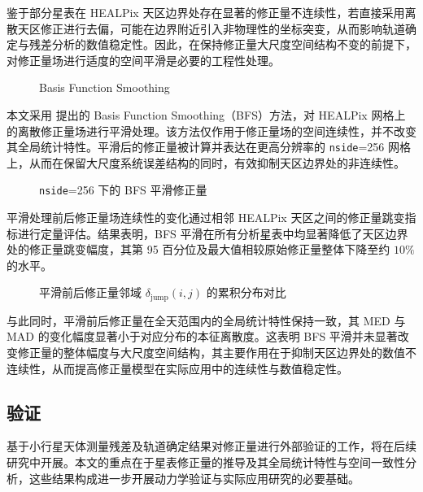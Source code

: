 \documentclass{aastex701}
\begin{document}
鉴于部分星表在 HEALPix 天区边界处存在显著的修正量不连续性，若直接采用离散天区修正进行去偏，可能在边界附近引入非物理性的坐标突变，从而影响轨道确定与残差分析的数值稳定性。因此，在保持修正量大尺度空间结构不变的前提下，对修正量场进行适度的空间平滑是必要的工程性处理。

\begin{figure}[ht!]
\caption{Basis Function Smoothing}
\label{fig:bias_ucac4_zoom_compare_n256}
\end{figure}

本文采用 \citet{Eggl2020Icarus} 提出的 Basis Function Smoothing（BFS）方法，对 HEALPix 网格上的离散修正量场进行平滑处理。该方法仅作用于修正量场的空间连续性，并不改变其全局统计特性。平滑后的修正量被计算并表达在更高分辨率的 \texttt{nside}=256 网格上，从而在保留大尺度系统误差结构的同时，有效抑制天区边界处的非连续性。

\begin{figure}[ht!]
\caption{\texttt{nside}=256 下的 BFS 平滑修正量}
\label{fig:bias_smooth}
\end{figure}

平滑处理前后修正量场连续性的变化通过相邻 HEALPix 天区之间的修正量跳变指标进行定量评估。结果表明，BFS 平滑在所有分析星表中均显著降低了天区边界处的修正量跳变幅度，其第 95 百分位及最大值相较原始修正量整体下降至约 $10\%$ 的水平。

\begin{figure}[ht!]
\caption{平滑前后修正量邻域 $\delta_{\text{jump}} (i, j)$ 的累积分布对比}
\label{fig:bias_jump}
\end{figure}

与此同时，平滑前后修正量在全天范围内的全局统计特性保持一致，其 MED 与 MAD 的变化幅度显著小于对应分布的本征离散度。这表明 BFS 平滑并未显著改变修正量的整体幅度与大尺度空间结构，其主要作用在于抑制天区边界处的数值不连续性，从而提高修正量模型在实际应用中的连续性与数值稳定性。

\subsection{验证} \label{subsec:validation}

基于小行星天体测量残差及轨道确定结果对修正量进行外部验证的工作，将在后续研究中开展。本文的重点在于星表修正量的推导及其全局统计特性与空间一致性分析，这些结果构成进一步开展动力学验证与实际应用研究的必要基础。
\end{document}
